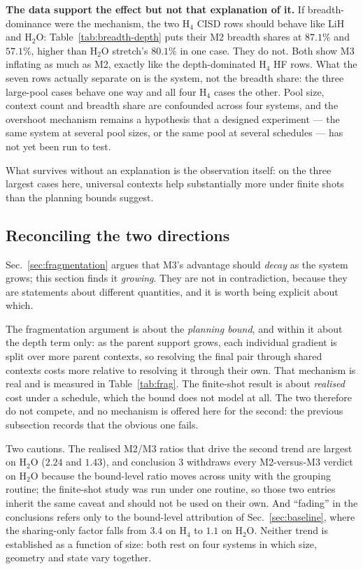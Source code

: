 \documentclass[10pt]{article}
\begin{document}
\textbf{The data support the effect but not that explanation of it.} If
breadth-dominance were the mechanism, the two H$_4$ CISD rows should behave like
LiH and H$_2$O: Table~\ref{tab:breadth-depth} puts their M2 breadth shares at
$87.1\%$ and $57.1\%$, higher than H$_2$O stretch's $80.1\%$ in one case. They do
not. Both show M3 inflating as much as M2, exactly like the depth-dominated H$_4$
HF rows. What the seven rows actually separate on is the system, not the breadth
share: the three large-pool cases behave one way and all four H$_4$ cases the
other. Pool size, context count and breadth share are confounded across four
systems, and the overshoot mechanism remains a hypothesis that a designed
experiment --- the same system at several pool sizes, or the same pool at several
schedules --- has not yet been run to test.

What survives without an explanation is the observation itself: on the three
largest cases here, universal contexts help substantially more under finite shots
than the planning bounds suggest.

\subsection{Reconciling the two directions}
\label{sec:size-trends}

Sec.~\ref{sec:fragmentation} argues that M3's advantage should \emph{decay} as the
system grows; this section finds it \emph{growing}. They are not in contradiction,
because they are statements about different quantities, and it is worth being
explicit about which.

The fragmentation argument is about the \emph{planning bound}, and within it about
the depth term only: as the parent support grows, each individual gradient is
split over more parent contexts, so resolving the final pair through shared
contexts costs more relative to resolving it through their own. That mechanism is
real and is measured in Table~\ref{tab:frag}. The finite-shot result is about
\emph{realised} cost under a schedule, which the bound does not model at all. The
two therefore do not compete, and no mechanism is offered here for the second:
the previous subsection records that the obvious one fails.

Two cautions. The realised M2/M3 ratios that drive the second trend are largest on
H$_2$O ($2.24$ and $1.43$), and conclusion 3 withdraws every M2-versus-M3 verdict
on H$_2$O because the bound-level ratio moves across unity with the grouping
routine; the finite-shot study was run under one routine, so those two entries
inherit the same caveat and should not be used on their own. And ``fading'' in the
conclusions refers only to the bound-level attribution of Sec.~\ref{sec:baseline},
where the sharing-only factor falls from $3.4$ on H$_4$ to $1.1$ on H$_2$O.
Neither trend is established as a function of size: both rest on four systems in
which size, geometry and state vary together.
\end{document}
